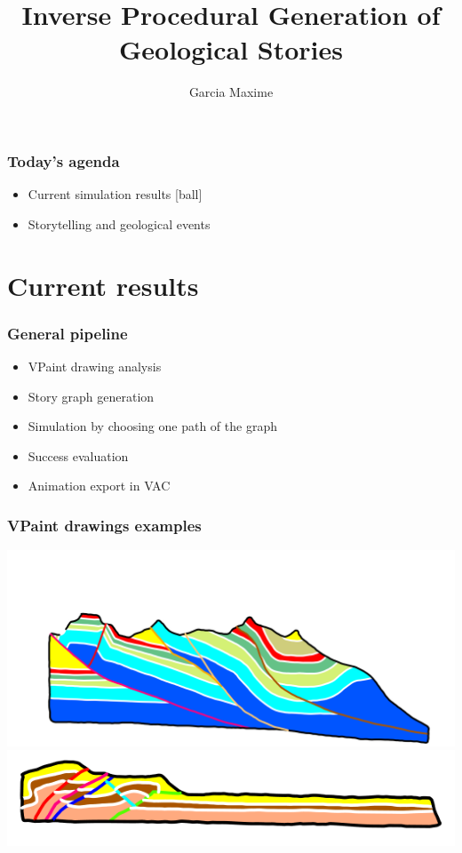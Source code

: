 \documentclass{beamer}
\title[Monthly Meeting]{Inverse Procedural Generation of Geological Stories}
\author{Garcia Maxime}
\begin{document}
	
    \begin{frame}[label=(intro)]
	\titlepage
    \end{frame}
	
	
	\begin{frame}
	\frametitle{Today's agenda}
	\begin{itemize}
	[ball]
	\item Current simulation results
	[ball]
	\item Storytelling and geological events 
	\end{itemize}
	\end{frame}
	
	
	\section{Current results}
	
	\begin{frame}
	\frametitle{General pipeline}
    \begin{itemize}
    \item VPaint drawing analysis
    \item Story graph generation
    \item Simulation by choosing one path of the graph
    \item Success evaluation
    \item Animation export in VAC
    \end{itemize}
    \end{frame}
    
    
	\begin{frame}
	\frametitle{VPaint drawings examples}
	\begin{center}
	\includegraphics[scale=0.25]{chartreuse.png}\\
	\includegraphics[scale=0.45]{bas1.png}
	\end{center}
	\end{frame}
	
\end{document}
